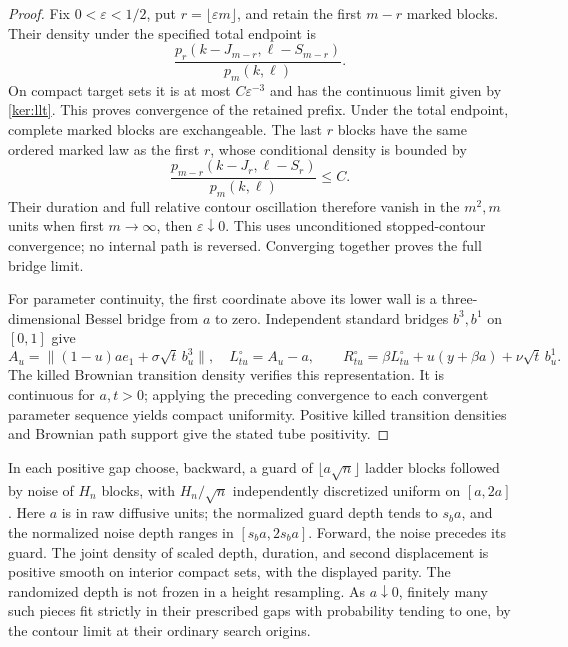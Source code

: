 \begin{proof}
Fix \(0<\varepsilon<1/2\), put \(r=\lfloor\varepsilon m\rfloor\),
and retain the first \(m-r\) marked blocks.  Their density under the
specified total endpoint is
\begin{equation}
 \frac{p_r(k-J_{m-r},\ell-S_{m-r})}{p_m(k,\ell)}.
 \label{ker:prefix-tilt}
\end{equation}
On compact target sets it is at most \(C\varepsilon^{-3}\) and has
the continuous limit given by \eqref{ker:llt}.  This proves
convergence of the retained prefix.  Under the total endpoint,
complete marked blocks are exchangeable.  The last \(r\) blocks have
the same ordered marked law as the first \(r\), whose conditional
density is bounded by
\[
 \frac{p_{m-r}(k-J_r,\ell-S_r)}{p_m(k,\ell)}\le C.
\]
Their duration and full relative contour oscillation therefore
vanish in the \(m^2,m\) units when first \(m\to\infty\), then
\(\varepsilon\downarrow0\).  This uses unconditioned stopped-contour
convergence; no internal path is reversed.  Converging together proves
the full bridge limit.

For parameter continuity, the first coordinate above its lower wall
is a three-dimensional Bessel bridge from \(a\) to zero.
Independent standard bridges \(b^3,b^1\) on \([0,1]\) give
\[
 A_u=\|(1-u)ae_1+\sigma\sqrt t\,b^3_u\|,\quad L^\circ_{tu}=A_u-a,
 \qquad
 R^\circ_{tu}=\beta L^\circ_{tu}+u(y+\beta a)+\nu\sqrt t\,b^1_u.
\]
The killed Brownian transition density verifies this representation.
It is continuous for \(a,t>0\); applying the preceding convergence
to each convergent parameter sequence yields compact uniformity.
Positive killed transition densities and Brownian path support give
the stated tube positivity.
\end{proof}

In each positive gap choose, backward, a guard of
\(\lfloor a\sqrt n\rfloor\) ladder blocks followed by noise of
\(H_n\) blocks, with \(H_n/\sqrt n\) independently discretized uniform
on \([a,2a]\).  Here \(a\) is in raw diffusive units; the normalized
guard depth tends to \(s_ba\), and the normalized noise depth ranges
in \([s_ba,2s_ba]\).  Forward, the noise precedes its guard.
The joint density of scaled depth, duration, and second displacement
is positive smooth on interior compact sets, with the displayed
parity.  The randomized depth is not frozen in a height resampling.
As \(a\downarrow0\), finitely many such pieces fit strictly in their
prescribed gaps with probability tending to one, by the contour
limit at their ordinary search origins.

